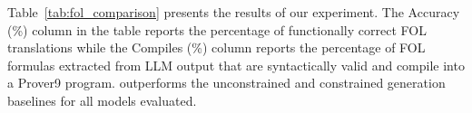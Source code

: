 Table~\ref{tab:fol_comparison} presents the results of our experiment. The Accuracy (\%) column in the table reports the percentage of functionally correct FOL translations while the Compiles (\%) column reports the percentage of FOL formulas extracted from LLM output that are syntactically valid and compile into a Prover9 program. 
\Tool{} outperforms the unconstrained and constrained generation baselines for all models evaluated. 





